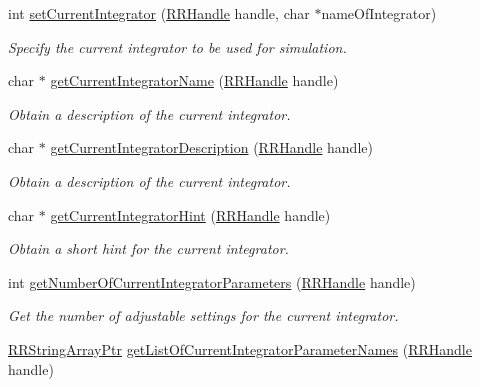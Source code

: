 \begin{DoxyCompactItemize}
int \hyperlink{group__simopts_ga7d4664a6a66a2a9b224db95b751127fe}{set\+Current\+Integrator} (\hyperlink{rrc__types_8h_a1d68f0592372208fa5a5f2799ea4b3ae}{R\+R\+Handle} handle, char $\ast$name\+Of\+Integrator)
\begin{DoxyCompactList}\small\item\em Specify the current integrator to be used for simulation. \end{DoxyCompactList}\item 
char $\ast$ \hyperlink{group__simopts_gac5b7c83a8b539302b657f4ad3522fc9c}{get\+Current\+Integrator\+Name} (\hyperlink{rrc__types_8h_a1d68f0592372208fa5a5f2799ea4b3ae}{R\+R\+Handle} handle)
\begin{DoxyCompactList}\small\item\em Obtain a description of the current integrator. \end{DoxyCompactList}\item 
char $\ast$ \hyperlink{group__simopts_ga4a917a0539977b7206d1bfbddcc98347}{get\+Current\+Integrator\+Description} (\hyperlink{rrc__types_8h_a1d68f0592372208fa5a5f2799ea4b3ae}{R\+R\+Handle} handle)
\begin{DoxyCompactList}\small\item\em Obtain a description of the current integrator. \end{DoxyCompactList}\item 
char $\ast$ \hyperlink{group__simopts_gadc3f18f7a683daa8848968ba54436f96}{get\+Current\+Integrator\+Hint} (\hyperlink{rrc__types_8h_a1d68f0592372208fa5a5f2799ea4b3ae}{R\+R\+Handle} handle)
\begin{DoxyCompactList}\small\item\em Obtain a short hint for the current integrator. \end{DoxyCompactList}\item 
int \hyperlink{group__simopts_ga7885d06904fc2cdceaa7e71448cde468}{get\+Number\+Of\+Current\+Integrator\+Parameters} (\hyperlink{rrc__types_8h_a1d68f0592372208fa5a5f2799ea4b3ae}{R\+R\+Handle} handle)
\begin{DoxyCompactList}\small\item\em Get the number of adjustable settings for the current integrator. \end{DoxyCompactList}\item 
\hyperlink{rrc__types_8h_a7c9475df6c7337d99482b13a365e7596}{R\+R\+String\+Array\+Ptr} \hyperlink{group__simopts_ga8bc1ea6950f141d40373416d64abaefa}{get\+List\+Of\+Current\+Integrator\+Parameter\+Names} (\hyperlink{rrc__types_8h_a1d68f0592372208fa5a5f2799ea4b3ae}{R\+R\+Handle} handle)

\end{DoxyCompactItemize}
